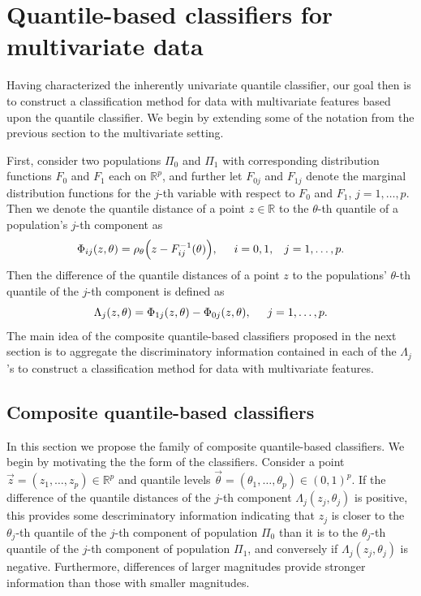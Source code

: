 
\section{Quantile-based classifiers for multivariate data}
\label{sec:multivariate-classifier}

Having characterized the inherently univariate quantile classifier, our goal
then is to construct a classification method for data with multivariate features
based upon the quantile classifier.  We begin by extending some of the notation
from the previous section to the multivariate setting.

First, consider two populations $\Pi_0$ and $\Pi_1$ with corresponding
distribution functions $F_0$ and $F_1$ each on $\mathbb{R}^{p}$, and further let
$F_{0j}$ and $F_{1j}$ denote the marginal distribution functions for the $j$-th
variable with respect to $F_0$ and $F_1$, $j = 1, \dots, p$.  Then we denote the
quantile distance of a point $z \in \mathbb{R}$ to the $\theta$-th quantile of a
population's $j$-th component as
\begin{equation}
  \label{eq:multivariate-phi}
  \Phi_{ij}(z, \theta) =
  \rho_{\theta}\Big(z - F_{ij}^{-1}(\theta) \Big),
  \hspace{5mm} i = 0, 1, \hspace{3mm} j = 1, \dots, p.
\end{equation}
Then the difference of the quantile distances of a point $z$ to the populations'
$\theta$-th quantile of the $j$-th component is defined as
\begin{equation}
  \Lambda_j (z, \theta) = \Phi_{1j}(z, \theta) - \Phi_{0j}(z, \theta),
  \hspace{5mm} j = 1, \dots, p.
\end{equation}
The main idea of the composite quantile-based classifiers proposed in the next
section is to aggregate the discriminatory information contained in each of the
$\Lambda_j$'s to construct a classification method for data with multivariate
features.


\subsection{Composite quantile-based classifiers}
\label{sec:varying-coefficient}

In this section we propose the family of composite quantile-based classifiers.
We begin by motivating the the form of the classifiers.  Consider a point
$\vec{z} = (z_1, \dots, z_p) \in \mathbb{R}^p$ and quantile levels
$\vec{\theta} = (\theta_1, \dots, \theta_p) \in (0, 1)^p$.  If the difference of
the quantile distances of the $j$-th component $\Lambda_j(z_j, \theta_j)$ is
positive, this provides some descriminatory information indicating that $z_j$ is
closer to the $\theta_j$-th quantile of the $j$-th component of population
$\Pi_0$ than it is to the $\theta_j$-th quantile of the $j$-th component of
population $\Pi_1$, and conversely if $\Lambda_j(z_j, \theta_j)$ is negative.
Furthermore, differences of larger magnitudes provide stronger information than
those with smaller magnitudes.

